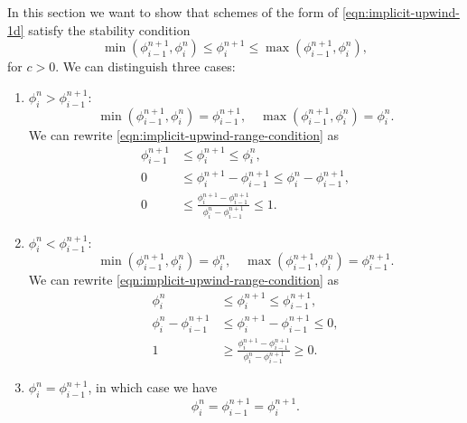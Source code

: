 \documentclass[../thesis.tex]{subfiles}
\begin{document}
In this section we want to show that schemes of the form of \eqref{eqn:implicit-upwind-1d} satisfy the stability condition
\begin{equation}\label{eqn:implicit-upwind-range-condition}
    \min\left( \phi_{i-1}^{n+1},\phi_{i}^{n} \right)
    \leq
    \phi_{i}^{n+1}
    \leq
    \max\left( \phi_{i-1}^{n+1},\phi_{i}^{n} \right),
\end{equation}
for \(c > 0\). We can distinguish three cases:
\begin{enumerate}
    \item \(\phi_{i}^{n} > \phi_{i-1}^{n+1}:\)
        \[\min\left( \phi_{i-1}^{n+1},\phi_{i}^{n} \right) = \phi_{i-1}^{n+1},\quad
        \max\left( \phi_{i-1}^{n+1},\phi_{i}^{n} \right) = \phi_{i}^{n}.\]
        We can rewrite \eqref{eqn:implicit-upwind-range-condition} as
        \begin{equation*}
            \begin{split}
                \phi_{i-1}^{n+1}
                &\leq
                \phi_{i}^{n+1}
                \leq
                \phi_{i}^{n},
                \\
                0
                &\leq
                \phi_{i}^{n+1} - \phi_{i-1}^{n+1}
                \leq
                \phi_{i}^{n} - \phi_{i-1}^{n+1},
                \\
                0
                &\leq
                \frac{\phi_{i}^{n+1} - \phi_{i-1}^{n+1}}{\phi_{i}^{n} - \phi_{i-1}^{n+1}}
                \leq
                1.
            \end{split}
        \end{equation*}
    \item \(\phi_{i}^{n} < \phi_{i-1}^{n+1}:\)
        \[\min\left( \phi_{i-1}^{n+1},\phi_{i}^{n} \right) = \phi_{i}^{n},\quad
        \max\left( \phi_{i-1}^{n+1},\phi_{i}^{n} \right) = \phi_{i-1}^{n+1}.\]
        We can rewrite \eqref{eqn:implicit-upwind-range-condition} as
        \begin{equation*}
            \begin{split}
                \phi_{i}^{n}
                &\leq
                \phi_{i}^{n+1}
                \leq
                \phi_{i-1}^{n+1},
                \\
                \phi_{i}^{n} - \phi_{i-1}^{n+1}
                &\leq
                \phi_{i}^{n+1} - \phi_{i-1}^{n+1}
                \leq
                0,
                \\
                1
                &\geq
                \frac{\phi_{i}^{n+1} - \phi_{i-1}^{n+1}}{\phi_{i}^{n} - \phi_{i-1}^{n+1}}
                \geq
                0.
            \end{split}
        \end{equation*}
    \item \(\phi_{i}^{n} = \phi_{i-1}^{n+1}\), in which case we have\[\phi_{i}^{n} = \phi_{i-1}^{n+1} = \phi_{i}^{n+1}.\]
\end{enumerate}
\end{document}
